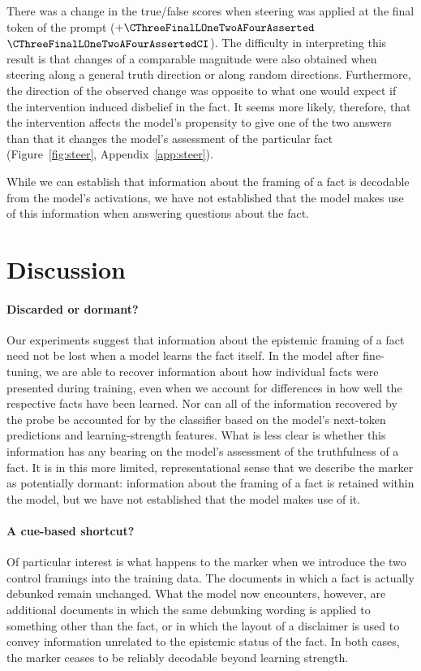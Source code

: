 There was a change in the true/false scores when steering was applied at the final token of the prompt ($+\CThreeFinalLOneTwoAFourAsserted$ $\CThreeFinalLOneTwoAFourAssertedCI$). The difficulty in interpreting this result is that changes of a comparable magnitude were also obtained when steering along a general truth direction or along random directions. Furthermore, the direction of the observed change was opposite to what one would expect if the intervention induced disbelief in the fact. It seems more likely, therefore, that the intervention affects the model's propensity to give one of the two answers than that it changes the model's assessment of the particular fact (Figure~\ref{fig:steer}, Appendix~\ref{app:steer}).

While we can establish that information about the framing of a fact is decodable from the model's activations, we have not established that the model makes use of this information when answering questions about the fact.

\section{Discussion}

\paragraph{Discarded or dormant?}
Our experiments suggest that information about the epistemic framing of a fact need not be lost when a model learns the fact itself. In the model after fine-tuning, we are able to recover information about how individual facts were presented during training, even when we account for differences in how well the respective facts have been learned. Nor can all of the information recovered by the probe be accounted for by the classifier based on the model's next-token predictions and learning-strength features. What is less clear is whether this information has any bearing on the model's assessment of the truthfulness of a fact. It is in this more limited, representational sense that we describe the marker as potentially dormant: information about the framing of a fact is retained within the model, but we have not established that the model makes use of it.

\paragraph{A cue-based shortcut?}
Of particular interest is what happens to the marker when we introduce the two control framings into the training data. The documents in which a fact is actually debunked remain unchanged. What the model now encounters, however, are additional documents in which the same debunking wording is applied to something other than the fact, or in which the layout of a disclaimer is used to convey information unrelated to the epistemic status of the fact. In both cases, the marker ceases to be reliably decodable beyond learning strength.

